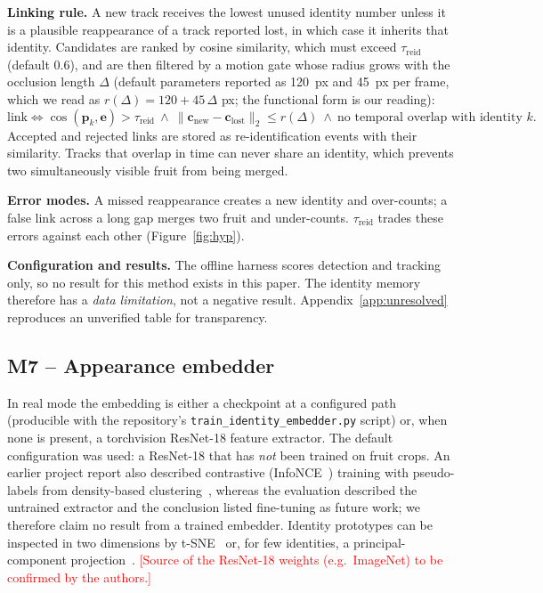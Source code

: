 \documentclass[11pt,a4paper]{article}
\newcommand{\todo}[1]{\textcolor{red}{[#1]}}
\begin{document}
\textbf{Linking rule.} A new track receives the lowest unused identity number unless it is a plausible reappearance of a track reported lost, in which case it inherits that identity. Candidates are ranked by cosine similarity, which must exceed $\tau_{\mathrm{reid}}$ (default 0.6), and are then filtered by a motion gate whose radius grows with the occlusion length $\Delta$ (default parameters reported as 120~px and 45~px per frame, which we read as $r(\Delta)=120+45\,\Delta$ px; the functional form is our reading):
\begin{equation}
\text{link}\iff\cos(\mathbf{p}_k,\mathbf{e})>\tau_{\mathrm{reid}}\ \wedge\ \lVert\mathbf{c}_{\text{new}}-\mathbf{c}_{\text{lost}}\rVert_2\le r(\Delta)\ \wedge\ \text{no temporal overlap with identity }k .\label{eq:link}
\end{equation}
Accepted and rejected links are stored as re-identification events with their similarity. Tracks that overlap in time can never share an identity, which prevents two simultaneously visible fruit from being merged.

\textbf{Error modes.} A missed reappearance creates a new identity and over-counts; a false link across a long gap merges two fruit and under-counts. $\tau_{\mathrm{reid}}$ trades these errors against each other (Figure~\ref{fig:hyp}).

\textbf{Configuration and results.} The offline harness scores detection and tracking only, so no result for this method exists in this paper. The identity memory therefore has a \emph{data limitation}, not a negative result. Appendix~\ref{app:unresolved} reproduces an unverified table for transparency.

\subsection{M7 -- Appearance embedder}
In real mode the embedding is either a checkpoint at a configured path (producible with the repository's \texttt{train\_identity\_embedder.py} script) or, when none is present, a torchvision ResNet-18 feature extractor. The default configuration was used: a ResNet-18 that has \emph{not} been trained on fruit crops. An earlier project report also described contrastive (InfoNCE~\cite{oord2018cpc}) training with pseudo-labels from density-based clustering~\cite{ester1996dbscan}, whereas the evaluation described the untrained extractor and the conclusion listed fine-tuning as future work; we therefore claim no result from a trained embedder. Identity prototypes can be inspected in two dimensions by t-SNE~\cite{vandermaaten2008tsne} or, for few identities, a principal-component projection~\cite{jolliffe2016pca}. \todo{Source of the ResNet-18 weights (e.g.\ ImageNet) to be confirmed by the authors.}
\end{document}
